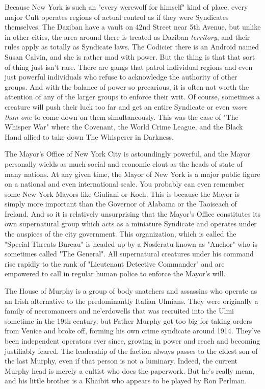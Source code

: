 Because New York is such an "every werewolf for himself" kind of place, every major Cult operates regions of actual control as if they were Syndicates themselves. The Daziban have a vault on 42nd Street near 5th Avenue, but unlike in other cities, the area around there is treated as Daziban \textit{territory}, and their rules apply as totally as Syndicate laws. The Codicier there is an Android named Susan Calvin, and she is rather mad with power. But the thing is that that sort of thing just isn't rare. There are gangs that patrol individual regions and even just powerful individuals who refuse to acknowledge the authority of other groups. And with the balance of power so precarious, it is often not worth the attention of any of the larger groups to enforce their writ. Of course, sometimes a creature will push their luck too far and get an entire Syndicate or even \textit{more than one} to come down on them simultaneously. This was the case of "The Whisper War" where the Covenant, the World Crime League, and the Black Hand allied to take down The Whisperer in Darkness.

The Mayor's Office of New York City is astoundingly powerful, and the Mayor personally wields as much social and economic clout as the heads of state of many nations. At any given time, the Mayor of New York is a major public figure on a national and even international scale. You probably can even remember some New York Mayors like Giuliani or Koch. This is because the Mayor is simply more important than the Governor of Alabama or the Taoiseach of Ireland. And so it is relatively unsurprising that the Mayor's Office constitutes its own supernatural group which acts as a miniature Syndicate and operates under the auspices of the city government. This organization, which is called the "Special Threats Bureau" is headed up by a Nosferatu known as "Anchor" who is sometimes called "The General". All supernatural creatures under his command rise rapidly to the rank of "Lieutenant Detective Commander" and are empowered to call in regular human police to enforce the Mayor's will.

The House of Murphy is a group of body snatchers and assassins who operate as an Irish alternative to the predominantly Italian Ulmians. They were originally a family of necromancers and ne'erdowells that was recruited into the Ulmi sometime in the 19th century, but Father Murphy got too big for taking orders from Venice and broke off, forming his own crime syndicate around 1914. They've been independent operators ever since, growing in power and reach and becoming justifiably feared. The leadership of the faction always passes to the eldest son of the last Murphy, even if that person is not a luminary. Indeed, the current Murphy head is merely a cultist who does the paperwork. But he's really mean, and his little brother is a Khaibit who appears to be played by Ron Perlman.

